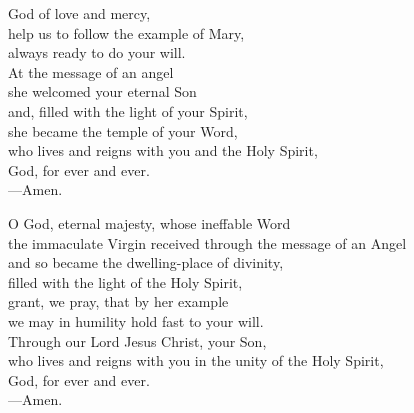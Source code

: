 \prayer


\begin{prayerverse}
God of love and mercy,\\
help us to follow the example of Mary,\\
always ready to do your will.\\
At the message of an angel\\
she welcomed your eternal Son\\
and, filled with the light of your Spirit,\\
she became the temple of your Word,\\
who lives and reigns with you and the Holy Spirit,\\
God, for ever and ever.\\
{\color{red}---\thinspace}Amen.
\end{prayerverse}


\begin{prayerverse}
O God, eternal majesty, whose ineffable Word\\
the immaculate Virgin received through the message of an Angel\\
and so became the dwelling-place of divinity,\\
filled with the light of the Holy Spirit,\\
grant, we pray, that by her example\\
we may in humility hold fast to your will.\\
Through our Lord Jesus Christ, your Son,\\
who lives and reigns with you in the unity of the Holy Spirit,\\
God, for ever and ever.\\
{\color{red}---\thinspace}Amen.

\end{prayerverse}

